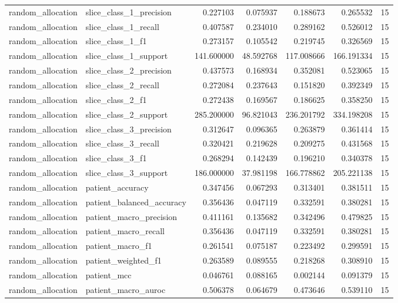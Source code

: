 \begin{tabular}{llrrrrr}
random_allocation & slice_class_1_precision & 0.227103 & 0.075937 & 0.188673 & 0.265532 & 15 \\
random_allocation & slice_class_1_recall & 0.407587 & 0.234010 & 0.289162 & 0.526012 & 15 \\
random_allocation & slice_class_1_f1 & 0.273157 & 0.105542 & 0.219745 & 0.326569 & 15 \\
random_allocation & slice_class_1_support & 141.600000 & 48.592768 & 117.008666 & 166.191334 & 15 \\
random_allocation & slice_class_2_precision & 0.437573 & 0.168934 & 0.352081 & 0.523065 & 15 \\
random_allocation & slice_class_2_recall & 0.272084 & 0.237643 & 0.151820 & 0.392349 & 15 \\
random_allocation & slice_class_2_f1 & 0.272438 & 0.169567 & 0.186625 & 0.358250 & 15 \\
random_allocation & slice_class_2_support & 285.200000 & 96.821043 & 236.201792 & 334.198208 & 15 \\
random_allocation & slice_class_3_precision & 0.312647 & 0.096365 & 0.263879 & 0.361414 & 15 \\
random_allocation & slice_class_3_recall & 0.320421 & 0.219628 & 0.209275 & 0.431568 & 15 \\
random_allocation & slice_class_3_f1 & 0.268294 & 0.142439 & 0.196210 & 0.340378 & 15 \\
random_allocation & slice_class_3_support & 186.000000 & 37.981198 & 166.778862 & 205.221138 & 15 \\
random_allocation & patient_accuracy & 0.347456 & 0.067293 & 0.313401 & 0.381511 & 15 \\
random_allocation & patient_balanced_accuracy & 0.356436 & 0.047119 & 0.332591 & 0.380281 & 15 \\
random_allocation & patient_macro_precision & 0.411161 & 0.135682 & 0.342496 & 0.479825 & 15 \\
random_allocation & patient_macro_recall & 0.356436 & 0.047119 & 0.332591 & 0.380281 & 15 \\
random_allocation & patient_macro_f1 & 0.261541 & 0.075187 & 0.223492 & 0.299591 & 15 \\
random_allocation & patient_weighted_f1 & 0.263589 & 0.089555 & 0.218268 & 0.308910 & 15 \\
random_allocation & patient_mcc & 0.046761 & 0.088165 & 0.002144 & 0.091379 & 15 \\
random_allocation & patient_macro_auroc & 0.506378 & 0.064679 & 0.473646 & 0.539110 & 15 \\

\end{tabular}
